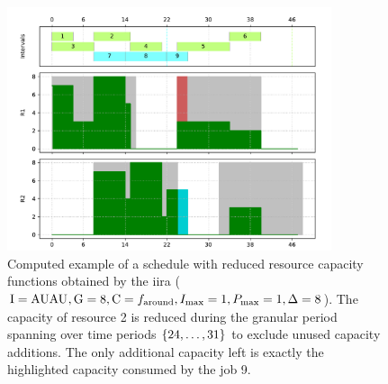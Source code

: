 \begin{figure}[p]
    \centering
    \includegraphics[width=0.85\textwidth]{img/example_solution_iira.pdf}
    \caption{
        Computed example of a schedule with reduced resource capacity functions obtained by the \ac{iira}
        ($\mathrm{I} = \operatorname{AUAU}_{}, \mathrm{G} = 8, \mathrm{C} = f_{\text{around}}, I_{\max} = 1, P_{\max} = 1, \Delta = 8$).
        The capacity of resource 2 is reduced during the granular period
        spanning over time periods $\{{24}, \dots, {31}\}$ to exclude unused capacity additions.
        The only additional capacity left is exactly the highlighted capacity consumed by the job 9.
    }
    \label{fig:example/iira-reduced}
\end{figure}

